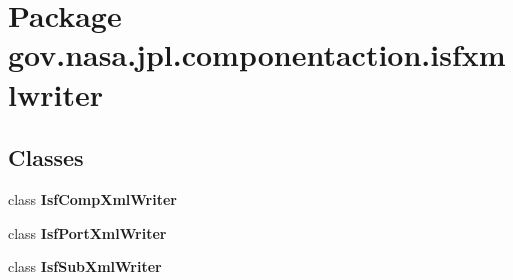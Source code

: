 \section{Package gov.\+nasa.\+jpl.\+componentaction.\+isfxmlwriter}
\label{namespacegov_1_1nasa_1_1jpl_1_1componentaction_1_1isfxmlwriter}
\subsection*{Classes}
\begin{DoxyCompactItemize}
\item 
class {\bf Isf\+Comp\+Xml\+Writer}
\item 
class {\bf Isf\+Port\+Xml\+Writer}
\item 
class {\bf Isf\+Sub\+Xml\+Writer}
\end{DoxyCompactItemize}
